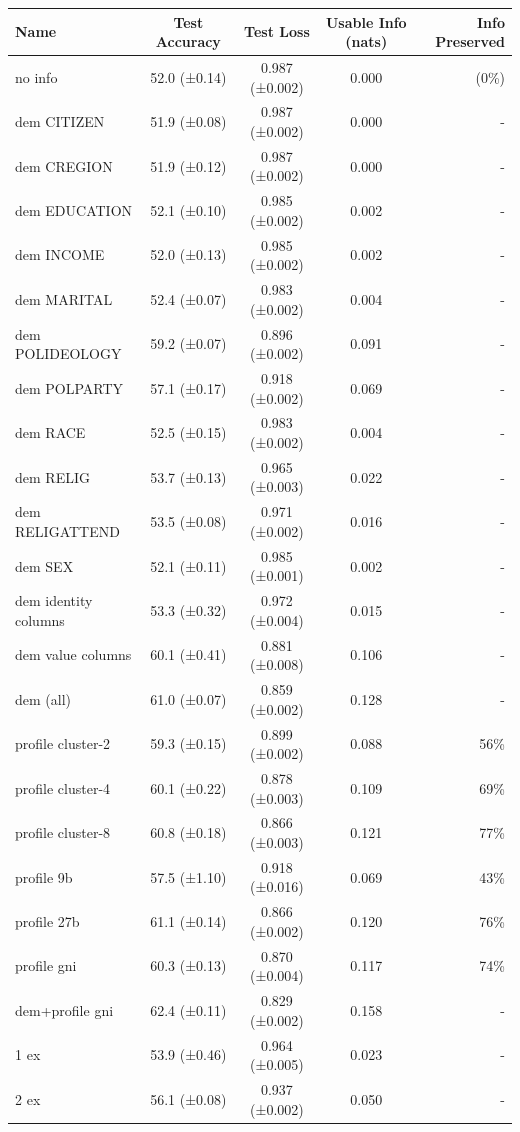 \documentclass[11pt]{article}
\begin{document}
\begin{table}[h]
\centering
\small
\begin{tabular}{|l|c|c|c|r|}
\hline
Name & Test Accuracy & Test Loss & Usable Info (nats) & Info Preserved \\
\hline
no info & 52.0 (±0.14) & 0.987 (±0.002) & 0.000 & (0\%) \\
dem CITIZEN & 51.9 (±0.08) & 0.987 (±0.002) & 0.000 & - \\
dem CREGION & 51.9 (±0.12) & 0.987 (±0.002) & 0.000 & - \\
dem EDUCATION & 52.1 (±0.10) & 0.985 (±0.002) & 0.002 & - \\
dem INCOME & 52.0 (±0.13) & 0.985 (±0.002) & 0.002 & - \\
dem MARITAL & 52.4 (±0.07) & 0.983 (±0.002) & 0.004 & - \\
dem POLIDEOLOGY & 59.2 (±0.07) & 0.896 (±0.002) & 0.091 & - \\
dem POLPARTY & 57.1 (±0.17) & 0.918 (±0.002) & 0.069 & - \\
dem RACE & 52.5 (±0.15) & 0.983 (±0.002) & 0.004 & - \\
dem RELIG & 53.7 (±0.13) & 0.965 (±0.003) & 0.022 & - \\
dem RELIGATTEND & 53.5 (±0.08) & 0.971 (±0.002) & 0.016 & - \\
dem SEX & 52.1 (±0.11) & 0.985 (±0.001) & 0.002 & - \\
dem identity columns & 53.3 (±0.32) & 0.972 (±0.004) & 0.015 & - \\
dem value columns & 60.1 (±0.41) & 0.881 (±0.008) & 0.106 & - \\
dem (all) & 61.0 (±0.07) & 0.859 (±0.002) & 0.128 & - \\
profile cluster-2 & 59.3 (±0.15) & 0.899 (±0.002) & 0.088 & 56\% \\
profile cluster-4 & 60.1 (±0.22) & 0.878 (±0.003) & 0.109 & 69\% \\
profile cluster-8 & 60.8 (±0.18) & 0.866 (±0.003) & 0.121 & 77\% \\
profile 9b & 57.5 (±1.10) & 0.918 (±0.016) & 0.069 & 43\% \\
profile 27b & 61.1 (±0.14) & 0.866 (±0.002) & 0.120 & 76\% \\
profile gni & 60.3 (±0.13) & 0.870 (±0.004) & 0.117 & 74\% \\
dem+profile gni & 62.4 (±0.11) & 0.829 (±0.002) & 0.158 & - \\
1 ex & 53.9 (±0.46) & 0.964 (±0.005) & 0.023 & - \\
2 ex & 56.1 (±0.08) & 0.937 (±0.002) & 0.050 & - \\

\end{tabular}
\end{table}
\end{document}
